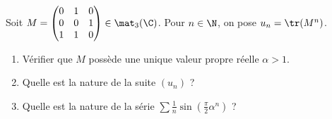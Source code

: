 \begin{enonce}
\begin{exercise}[ID={RMS 113/4 87 X/MP},subtitle={},tags={}, difficulty={0}]
Soit 
$M=
\begin{pmatrix}
    0&1&0\\
    0&0&1\\
    1&1&0
\end{pmatrix}
\in\mat_3(\C)$.
Pour $n\in\N$, on pose $u_n=\tr(M^n)$.
\begin{enumerate}
\item Vérifier que $M$ possède une unique valeur propre réelle $\alpha>1$.
\item Quelle est la nature de la suite $(u_n)$ ?
\item Quelle est la nature de la série $\sum\frac1n\sin\left(\frac\pi2 \alpha^n\right)$ ?
\end{enumerate}
\end{exercise}
\begin{solution}
\end{solution}
\end{enonce}
